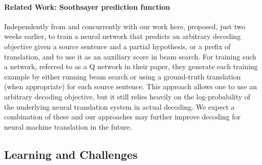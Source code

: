 



\paragraph{Related Work: Soothsayer prediction function}

Independently from and concurrently with our work here, \citet{li2017learning} proposed, just two weeks earlier, to train a neural network that predicts an arbitrary decoding objective given a source sentence and a partial hypothesis, or a prefix of translation, and to use it as an auxiliary score in beam search. For training such a network, referred to as a Q network in their paper, they generate each training example by either running beam search or using a ground-truth translation (when appropriate) for each source sentence. This approach allows one to use an arbitrary decoding objective, but it still relies heavily on the log-probability of the underlying neural translation system in actual decoding. We expect a combination of these and our approaches may further improve decoding for neural machine translation in the future.

\subsection{Learning and Challenges}

